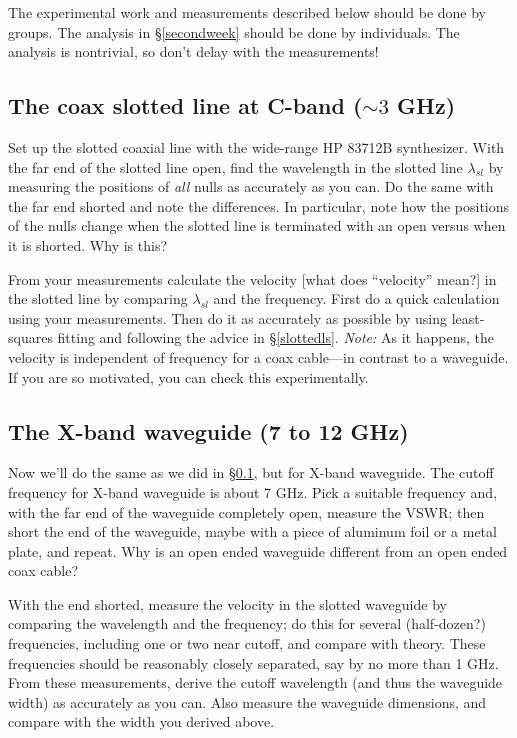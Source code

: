 \documentclass[12pt,preprint]{aastex}
\begin{document}
The experimental work and measurements described below should
be done by groups.  The analysis in \S \ref{secondweek} should be done
by individuals. The analysis is nontrivial, so don't delay with the
measurements!

{\boldmath %
\subsection {The coax slotted line at C-band ($\sim 3$ GHz)} \label{slotted}
} Set up the slotted coaxial line with the wide-range HP 83712B
synthesizer.  With the far end of the slotted line open, find the
wavelength in the slotted line $\lambda_{sl}$ by measuring the positions
of {\it all} nulls as accurately as you can.  Do the same with the far
end shorted and note the differences.  In particular, note how the
positions of the nulls change when the slotted line is terminated with
an open versus when it is shorted.  Why is this?

From your measurements calculate the velocity [what does ``velocity''
  mean?] in the slotted line by comparing $\lambda_{sl}$ and the
frequency.  First do a quick calculation using your measurements. Then
do it as accurately as possible by using least-squares fitting and
following the advice in \S \ref{slottedls}.  {\it Note:} As it happens,
the velocity is independent of frequency for a coax cable---in contrast
to a waveguide.  If you are so motivated, you can check this
experimentally.

\subsection {The X-band waveguide (7 to 12 GHz)} \label{waveguide}

Now we'll do the same as we did in \S \ref{slotted}, but for X-band
waveguide.  The cutoff frequency for X-band waveguide is about 7
GHz. Pick a suitable frequency and, with the far end of the waveguide
completely open, measure the VSWR; then short the end of the waveguide,
maybe with a piece of aluminum foil or a metal plate, and repeat.  Why
is an open ended waveguide different from an open ended coax cable?

With the end shorted, measure the velocity in the slotted waveguide by
comparing the wavelength and the frequency; do this for several
(half-dozen?) frequencies, including one or two near cutoff, and compare
with theory.  These frequencies should be reasonably closely separated,
say by no more than 1 GHz.  From these measurements, derive the cutoff
wavelength (and thus the waveguide width) as accurately as you can.
Also measure the waveguide dimensions, and compare 
with the width you derived above.
\end{document}

